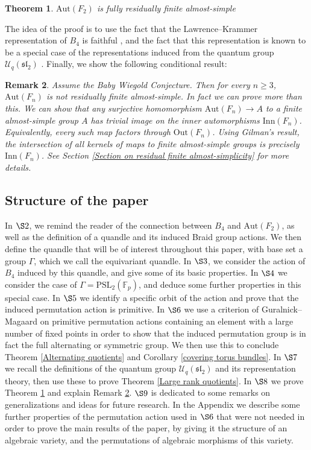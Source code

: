 \documentclass[letterpaper]{amsart}
\newtheorem{theorem}{Theorem}[section]
\newtheorem{remark}[theorem]{Remark}
\begin{document}
\begin{theorem}
\label{Fully Residually Finite Simple}
$\mathrm{Aut}(F_2)$ is fully residually finite almost-simple
\end{theorem}
The idea of the proof is to use the fact that the Lawrence--Krammer representation of $B_4$ is faithful \cite{bigelow2001braid}, and the fact that this representation is known to be a special case of the representations induced from the quantum group $\mathcal{U}_q(\mathfrak{sl}_2)$ \cite{jackson2011lawrence}.
Finally, we show the following conditional result:
\begin{remark}
\label{AutFn not residually finite simple}
Assume the Baby Wiegold Conjecture. Then for every $n\geq 3$, $\mathrm{Aut}(F_n)$ is not residually finite almost-simple.
In fact we can prove more than this. We can show that any surjective homomorphism $\mathrm{Aut}(F_n) \to A$ to a finite almost-simple group $A$ has trivial image on the inner automorphisms $\mathrm{Inn}(F_n)$. Equivalently, every such map factors through $\mathrm{Out}(F_n)$. Using Gilman's result, the intersection of all kernels of maps to finite almost-simple groups is precisely $\mathrm{Inn}(F_n)$. See Section \ref{Section on residual finite almost-simplicity} for more details.
\end{remark}
\subsection{Structure of the paper}
In $\S2$, we remind the reader of the connection between $B_4$ and $\mathrm{Aut}(F_2)$, as well as the definition of a quandle and its induced Braid group actions. We then define the quandle that will be of interest throughout this paper, with base set a group $\Gamma$, which we call the equivariant quandle.
In $\S3$, we consider the action of $B_4$ induced by this quandle, and give some of its basic properties.
In $\S4$ we consider the case of $\Gamma = \mathrm{PSL}_2(\mathbb{F}_p)$, and deduce some further properties in this special case.
In $\S5$ we identify a specific orbit of the action and prove that the induced permutation action is primitive. In $\S6$ we use a criterion of Guralnick--Magaard \cite{guralnick1998minimal} on primitive permutation actions containing an element with a large number of fixed points in order to show that the induced permutation group is in fact the full alternating or symmetric group. We then use this to conclude Theorem \ref{Alternating quotients} and Corollary \ref{covering torus bundles}.
In $\S7$ we recall the definitions of the quantum group $\mathcal{U}_q(\mathfrak{sl}_2)$ and its representation theory, then use these to prove Theorem \ref{Large rank quotients}.
In $\S8$ we prove Theorem \ref{Fully Residually Finite Simple} and explain Remark \ref{AutFn not residually finite simple}.
$\S9$ is dedicated to some remarks on generalizations and ideas for future research.
In the Appendix we describe some further properties of the permutation action used in $\S6$ that were not needed in order to prove the main results of the paper, by giving it the structure of an algebraic variety, and the permutations of algebraic morphisms of this variety.
\end{document}
